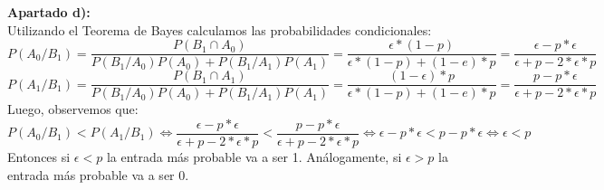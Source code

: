 \documentclass[11pt]{article}
\begin{document}

\begin{justify}
  \textbf{Apartado d):} \\
  Utilizando el Teorema de Bayes calculamos las probabilidades condicionales:
  \begin{equation*}
    P(A_0/B_1) = \frac{P(B_1 \cap A_0)}{P(B_1/A_0)P(A_0) + P(B_1/A_1)P(A_1)}
    = \frac{\epsilon * (1-p)}{\epsilon * (1-p) + (1-e) * p} =
    \frac{\epsilon - p * \epsilon}{\epsilon + p - 2 * \epsilon * p}
  \end{equation*}
  \begin{equation*}
    P(A_1/B_1) = \frac{P(B_1 \cap A_1)}{P(B_1/A_0)P(A_0) + P(B_1/A_1)P(A_1)}
    = \frac{(1 - \epsilon) * p}{\epsilon * (1-p) + (1-e) * p} =
    \frac{p - p * \epsilon}{\epsilon + p - 2 * \epsilon * p}
  \end{equation*}
  Luego, observemos que: 
  \begin{equation*}
    P(A_0/B_1) < P(A_1/B_1) \iff 
    \frac{\epsilon - p * \epsilon}{\epsilon + p - 2 * \epsilon * p} <
    \frac{p - p * \epsilon}{\epsilon + p - 2 * \epsilon * p} \iff 
    \epsilon - p * \epsilon < p - p * \epsilon \iff \epsilon < p
  \end{equation*}
  Entonces si $\epsilon < p$ la entrada más probable va a ser 1.
  Análogamente, si $\epsilon > p$ la entrada más probable va a ser 0.
\end{justify}
\end{document}
